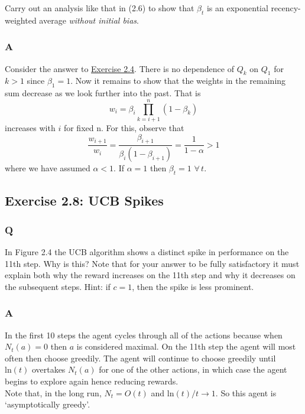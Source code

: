Carry out an analysis like that in (2.6) to show that $\beta_t$ is an exponential recency-weighted average \emph{without initial bias}. 

\subsubsection{A}
Consider the answer to \hyperref[ex:2.4]{Exercise 2.4}. There is no dependence of $Q_k$ on $Q_1$ for $k > 1$ since $\beta_1 = 1$. Now it remains to show that the weights in the remaining sum decrease as we look further into the past. That is
\begin{equation}
    w_i = \beta_i \prod_{k = i + 1}^{n} (1 - \beta_k)
\end{equation}
increases with $i$ for fixed n. For this, observe that
\begin{equation}
    \frac{w_{i+1}}{w_i} = \frac{\beta_{i+1}}{\beta_i(1 - \beta_{i + 1})} = \frac{1}{1 - \alpha} > 1
\end{equation} 
where we have assumed $\alpha < 1$. If $\alpha = 1$ then $\beta_t = 1 \,\, \forall \, t$.

\subsection{Exercise 2.8: UCB Spikes}
\subsubsection{Q}
In Figure 2.4 the UCB algorithm shows a distinct spike in performance on the 11th step. Why is this? Note that for your answer to be fully satisfactory it must explain both why the reward increases on the 11th step and why it decreases on the subsequent steps. Hint: if $c = 1$, then the spike is less prominent.

\subsubsection{A}
In the first 10 steps the agent cycles through all of the actions because when $N_t(a) = 0$ then $a$ is considered maximal. On the 11th step the agent will most often then choose greedily. The agent will continue to choose greedily until $\mathrm{ln}(t)$ overtakes $N_t(a)$ for one of the other actions, in which case the agent begins to explore again hence reducing rewards.\\

Note that, in the long run, $N_t = O(t)$ and $\mathrm{ln}(t) / t \to 1$. So this agent is `asymptotically greedy'.


